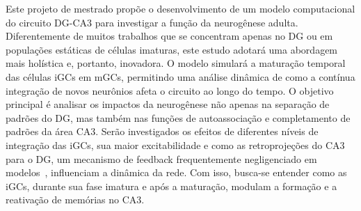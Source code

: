 Este projeto de mestrado propõe o desenvolvimento de um modelo computacional do circuito DG-CA3 para investigar a função da
neurogênese adulta. Diferentemente de muitos trabalhos que se concentram apenas no DG ou em populações estáticas de células
imaturas, este estudo adotará uma abordagem mais holística e, portanto, inovadora. O modelo simulará a maturação temporal das
células iGCs em mGCs, permitindo uma análise dinâmica de como a contínua integração de novos neurônios afeta o circuito ao longo
do tempo. O objetivo principal é analisar os impactos da neurogênese não apenas na separação de padrões do DG, mas também nas
funções de autoassociação e completamento de padrões da área CA3. Serão investigados os efeitos de diferentes níveis de
integração das iGCs, sua maior excitabilidade e como as retroprojeções do CA3 para o DG, um mecanismo de feedback frequentemente
negligenciado em modelos~\cite{myersPattern2011}, influenciam a dinâmica da rede. Com isso, busca-se entender como as iGCs,
durante sua fase imatura e após a maturação, modulam a formação e a reativação de memórias no CA3.
